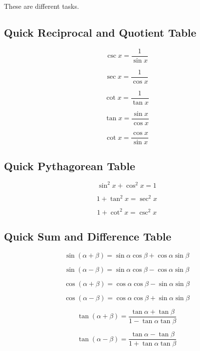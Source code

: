 These are different tasks.

\subsection{Quick Reciprocal and Quotient Table}
\label{subsec:quick-reciprocal-quotient-trig}

\[
\boxed{
\csc x
=
\frac1{\sin x}
}
\]

\[
\boxed{
\sec x
=
\frac1{\cos x}
}
\]

\[
\boxed{
\cot x
=
\frac1{\tan x}
}
\]

\[
\boxed{
\tan x
=
\frac{\sin x}{\cos x}
}
\]

\[
\boxed{
\cot x
=
\frac{\cos x}{\sin x}
}
\]

\subsection{Quick Pythagorean Table}
\label{subsec:quick-pythagorean-trig}

\[
\boxed{
\sin^2x+\cos^2x=1
}
\]

\[
\boxed{
1+\tan^2x=\sec^2x
}
\]

\[
\boxed{
1+\cot^2x=\csc^2x
}
\]

\subsection{Quick Sum and Difference Table}
\label{subsec:quick-sum-difference-trig}

\[
\boxed{
\sin(\alpha+\beta)
=
\sin\alpha\cos\beta
+
\cos\alpha\sin\beta
}
\]

\[
\boxed{
\sin(\alpha-\beta)
=
\sin\alpha\cos\beta
-
\cos\alpha\sin\beta
}
\]

\[
\boxed{
\cos(\alpha+\beta)
=
\cos\alpha\cos\beta
-
\sin\alpha\sin\beta
}
\]

\[
\boxed{
\cos(\alpha-\beta)
=
\cos\alpha\cos\beta
+
\sin\alpha\sin\beta
}
\]

\[
\boxed{
\tan(\alpha+\beta)
=
\frac{
\tan\alpha+\tan\beta
}{
1-\tan\alpha\tan\beta
}
}
\]

\[
\boxed{
\tan(\alpha-\beta)
=
\frac{
\tan\alpha-\tan\beta
}{
1+\tan\alpha\tan\beta
}
}
\]

